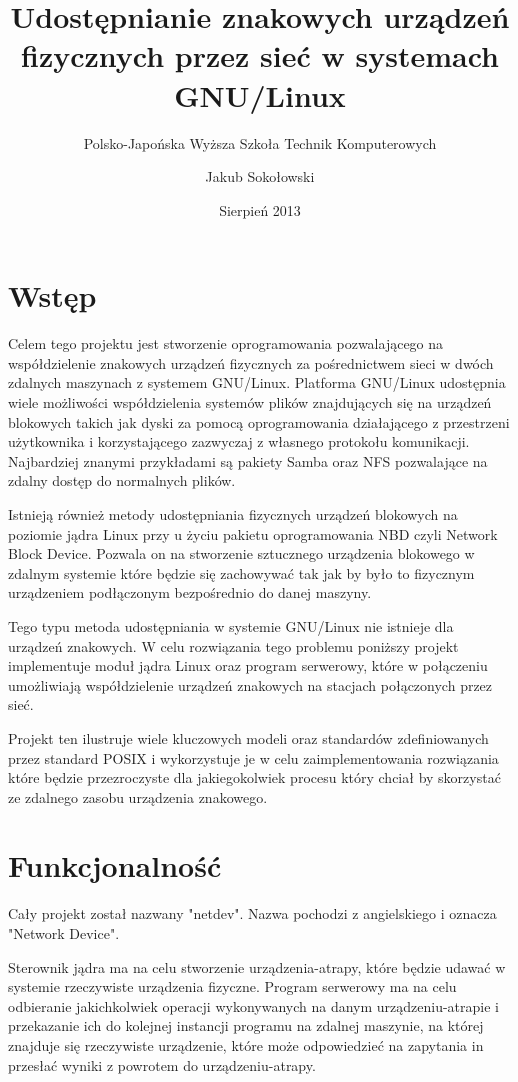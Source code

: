 \documentclass[10pt]{scrartcl}
\title{Udostępnianie znakowych urządzeń fizycznych przez sieć w systemach GNU/Linux}
\subtitle{Polsko-Japońska Wyższa Szkoła Technik Komputerowych}
\author{Jakub Sokołowski}
\date{Sierpień 2013}
\begin{document}
\newpage
\section{Wstęp}
\label{abstract}

Celem tego projektu jest stworzenie oprogramowania pozwalającego na współdzielenie znakowych urządzeń fizycznych za pośrednictwem sieci w dwóch zdalnych maszynach z systemem GNU/Linux. Platforma GNU/Linux udostępnia wiele możliwości współdzielenia systemów plików znajdujących się na urządzeń blokowych takich jak dyski za pomocą oprogramowania działającego z przestrzeni użytkownika i korzystającego zazwyczaj z własnego protokołu komunikacji. Najbardziej znanymi przykładami są pakiety Samba oraz NFS pozwalające na zdalny dostęp do normalnych plików.


Istnieją również metody udostępniania fizycznych urządzeń blokowych na poziomie jądra Linux przy u życiu pakietu oprogramowania NBD czyli Network Block Device. Pozwala on na stworzenie sztucznego urządzenia blokowego w zdalnym systemie które będzie się zachowywać tak jak by było to fizycznym urządzeniem podłączonym bezpośrednio do danej maszyny.

Tego typu metoda udostępniania w systemie GNU/Linux nie istnieje dla urządzeń znakowych. W celu rozwiązania tego problemu poniższy projekt implementuje moduł jądra Linux oraz program serwerowy, które w połączeniu umożliwiają współdzielenie urządzeń znakowych na stacjach połączonych przez sieć.

Projekt ten ilustruje wiele kluczowych modeli oraz standardów zdefiniowanych przez standard POSIX i wykorzystuje je w celu zaimplementowania rozwiązania które będzie przezroczyste dla jakiegokolwiek procesu który chciał by skorzystać ze zdalnego zasobu urządzenia znakowego.

\section{Funkcjonalność}
\label{functionality}

Cały projekt został nazwany "netdev". Nazwa pochodzi z angielskiego i oznacza "Network Device".

Sterownik jądra ma na celu stworzenie urządzenia-atrapy, które będzie udawać w systemie rzeczywiste urządzenia fizyczne. Program serwerowy ma na celu odbieranie jakichkolwiek operacji wykonywanych na danym urządzeniu-atrapie i przekazanie ich do kolejnej instancji programu na zdalnej maszynie, na której znajduje się rzeczywiste urządzenie, które może odpowiedzieć na zapytania in przesłać wyniki z powrotem do urządzeniu-atrapy.
\end{document}
